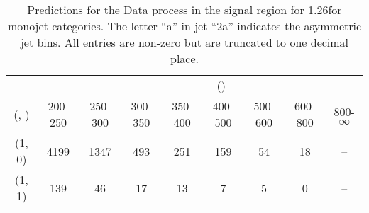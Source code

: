\begin{table}[h!]
\tiny
\centering
\caption{Predictions for the Data process in the signal region for 1.26\ifb for monojet categories. The letter ``a'' in jet \eg ``2a''  indicates the asymmetric jet bins. All entries are non-zero but are truncated to one decimal place.\label{tab:predsep_sig_data_mono}}
\begin{tabular}
{ccccccccc}
	\hline\hline
&	& \multicolumn{8}{c}{\scalht (\gev)} \\ 
	 (\njet,  \nb) & 200-250 & 250-300 & 300-350 & 350-400 & 400-500 & 500-600 & 600-800 & 800-$\infty$ \\ [0.8ex] 
\hline
	(1, 0) & 4199 & 1347 & 493 & 251 & 159 & 54 & 18 & -- \\[0.5ex] 
	(1, 1) & 139 & 46 & 17 & 13 & 7 & 5 & 0 & -- \\[0.5ex] 
	\hline
	\hline
\end{tabular}
\end{table}
